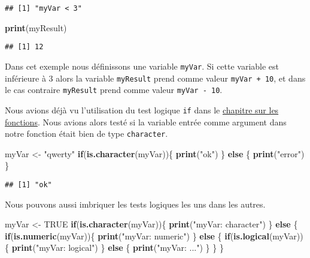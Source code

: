 \documentclass[]{book}
\newenvironment{Shaded}{\begin{snugshade}}{\end{snugshade}}
\newcommand{\KeywordTok}[1]{\textcolor[rgb]{0.13,0.29,0.53}{\textbf{#1}}}
\newcommand{\StringTok}[1]{\textcolor[rgb]{0.31,0.60,0.02}{#1}}
\newcommand{\OtherTok}[1]{\textcolor[rgb]{0.56,0.35,0.01}{#1}}
\newcommand{\ControlFlowTok}[1]{\textcolor[rgb]{0.13,0.29,0.53}{\textbf{#1}}}
\newcommand{\NormalTok}[1]{#1}
\theoremstyle{definition}
\theoremstyle{definition}
\theoremstyle{definition}
\theoremstyle{remark}
\begin{document}
\begin{verbatim}
## [1] "myVar < 3"
\end{verbatim}

\begin{Shaded}
\begin{Highlighting}[]
\KeywordTok{print}\NormalTok{(myResult)}
\end{Highlighting}
\end{Shaded}

\begin{verbatim}
## [1] 12
\end{verbatim}

Dans cet exemple nous définissons une variable \texttt{myVar}. Si cette
variable est inférieure à 3 alors la variable \texttt{myResult} prend
comme valeur \texttt{myVar\ +\ 10}, et dans le cas contraire
\texttt{myResult} prend comme valeur \texttt{myVar\ -\ 10}.

Nous avions déjà vu l'utilisation du test logique \texttt{if} dans le
\protect\hyperlink{l015function}{chapitre sur les fonctions}. Nous
avions alors testé si la variable entrée comme argument dans notre
fonction était bien de type \texttt{character}.

\begin{Shaded}
\begin{Highlighting}[]
\NormalTok{myVar <-}\StringTok{ "qwerty"}
\ControlFlowTok{if}\NormalTok{(}\KeywordTok{is.character}\NormalTok{(myVar))\{}
  \KeywordTok{print}\NormalTok{(}\StringTok{"ok"}\NormalTok{)}
\NormalTok{\} }\ControlFlowTok{else}\NormalTok{ \{}
  \KeywordTok{print}\NormalTok{(}\StringTok{"error"}\NormalTok{)}
\NormalTok{\}}
\end{Highlighting}
\end{Shaded}

\begin{verbatim}
## [1] "ok"
\end{verbatim}

Nous pouvons aussi imbriquer les tests logiques les uns dans les autres.

\begin{Shaded}
\begin{Highlighting}[]
\NormalTok{myVar <-}\StringTok{ }\OtherTok{TRUE}
\ControlFlowTok{if}\NormalTok{(}\KeywordTok{is.character}\NormalTok{(myVar))\{}
  \KeywordTok{print}\NormalTok{(}\StringTok{"myVar: character"}\NormalTok{)}
\NormalTok{\} }\ControlFlowTok{else}\NormalTok{ \{}
  \ControlFlowTok{if}\NormalTok{(}\KeywordTok{is.numeric}\NormalTok{(myVar))\{}
    \KeywordTok{print}\NormalTok{(}\StringTok{"myVar: numeric"}\NormalTok{)}
\NormalTok{  \} }\ControlFlowTok{else}\NormalTok{ \{}
    \ControlFlowTok{if}\NormalTok{(}\KeywordTok{is.logical}\NormalTok{(myVar))\{}
      \KeywordTok{print}\NormalTok{(}\StringTok{"myVar: logical"}\NormalTok{)}
\NormalTok{    \} }\ControlFlowTok{else}\NormalTok{ \{}
      \KeywordTok{print}\NormalTok{(}\StringTok{"myVar: ..."}\NormalTok{)}
\NormalTok{    \}}
\NormalTok{  \}}
\NormalTok{\}}
\end{Highlighting}
\end{Shaded}
\end{document}
